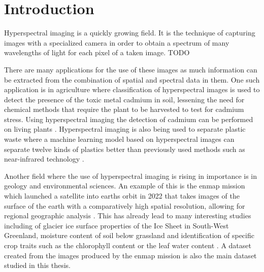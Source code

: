 \chapter{Introduction\label{cha:chapter1}}
Hyperspectral imaging is a quickly growing field. It is the technique of capturing images with a specialized camera in order to obtain a spectrum of many wavelengths of light for each pixel of a taken image. TODO 

There are many applications for the use of these images as much information can be extracted from the combination of spatial and spectral data in them. One such application is in agriculture where classification of hyperspectral images is used to detect the presence of the toxic metal cadmium in soil, lessening the need for chemical methods that require the plant to be harvested to test for cadmium stress. Using hyperspectral imaging the detection of cadmium can be performed on living plants \citep{zea_leveraging_2022}. Hyperspectral imaging is also being used to separate plastic waste where a machine learning model based on hyperspectral images can separate twelve kinds of plastics better than previously used methods such as near-infrared technology \citep{henriksen_plastic_2022}.

Another field where the use of hyperspectral imaging is rising in importance is in geology and environmental sciences. An example of this is the \ac{enmap} mission which launched a satellite into earths orbit in 2022 that takes images of the surface of the earth with a comparatively high spatial resolution, allowing for regional geographic analysis \citep{guanter_enmap_2015}.
This has already lead to many interesting studies including of glacier ice surface properties of the Ice Sheet in South-West Greenland, moisture content of soil below grassland and identification of specific crop traits such as the chlorophyll content or the leaf water content \citep{bohn_glacier_2022}\citep{pascual-venteo_prototyping_2022}\citep{dopper_estimating_2022}.
A dataset created from the images produced by the \ac{enmap} mission is also the main dataset studied in this thesis.

